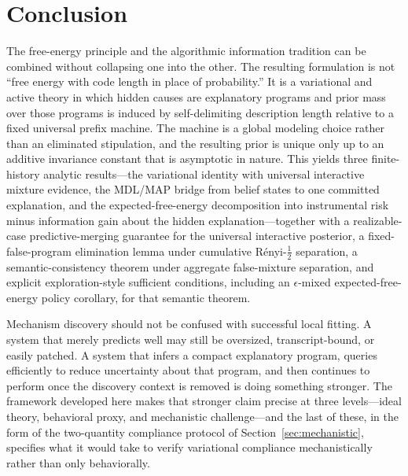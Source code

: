 \documentclass[11pt]{article}
\theoremstyle{remark}
\begin{document}
\section{Conclusion}

The free-energy principle and the algorithmic information tradition can be combined without collapsing one into the other. The resulting formulation is not ``free energy with code length in place of probability.'' It is a variational and active theory in which hidden causes are explanatory programs and prior mass over those programs is induced by self-delimiting description length relative to a fixed universal prefix machine. The machine is a global modeling choice rather than an eliminated stipulation, and the resulting prior is unique only up to an additive invariance constant that is asymptotic in nature. This yields three finite-history analytic results---the variational identity with universal interactive mixture evidence, the MDL/MAP bridge from belief states to one committed explanation, and the expected-free-energy decomposition into instrumental risk minus information gain about the hidden explanation---together with a realizable-case predictive-merging guarantee for the universal interactive posterior, a fixed-false-program elimination lemma under cumulative R\'enyi-\(\frac12\) separation, a semantic-consistency theorem under aggregate false-mixture separation, and explicit exploration-style sufficient conditions, including an \(\epsilon\)-mixed expected-free-energy policy corollary, for that semantic theorem.

Mechanism discovery should not be confused with successful local fitting. A system that merely predicts well may still be oversized, transcript-bound, or easily patched. A system that infers a compact explanatory program, queries efficiently to reduce uncertainty about that program, and then continues to perform once the discovery context is removed is doing something stronger. The framework developed here makes that stronger claim precise at three levels---ideal theory, behavioral proxy, and mechanistic challenge---and the last of these, in the form of the two-quantity compliance protocol of Section~\ref{sec:mechanistic}, specifies what it would take to verify variational compliance mechanistically rather than only behaviorally.



\end{document}
